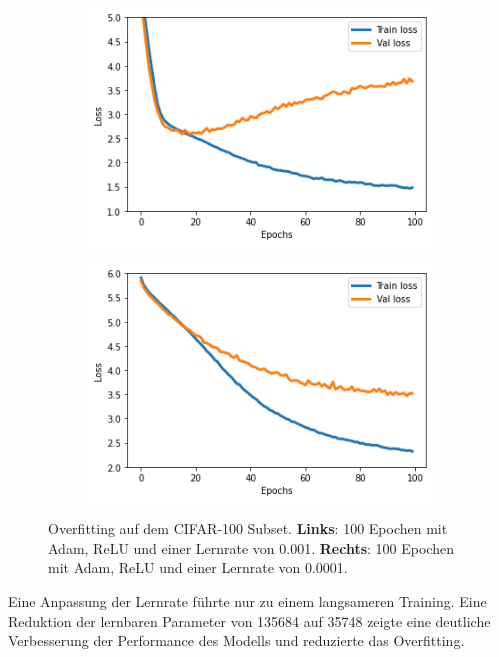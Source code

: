 \begin{figure}[H]
  \centering
  \vspace{1cm}
  \begin{subfigure}
    \centering
    \includegraphics[width=.48\textwidth]{resources/experiments/cifar_100_324_0001.png}
  \end{subfigure}
  \begin{subfigure}
    \centering
    \includegraphics[width=.48\textwidth]{resources/experiments/cifar_100_324_00001.png}
  \end{subfigure}

  \caption{Overfitting auf dem CIFAR-100 Subset. \textbf{Links}: 100 Epochen mit Adam, ReLU und einer Lernrate von 0.001. \textbf{Rechts}:
  100 Epochen mit Adam, ReLU und einer Lernrate von 0.0001.}
  \label{image:gute-ergebnisse-cifar}
\end{figure}

Eine Anpassung der Lernrate führte nur zu einem langsameren Training. Eine Reduktion der lernbaren Parameter von 135684 auf 35748 zeigte 
eine deutliche Verbesserung der Performance des Modells und reduzierte das Overfitting.

